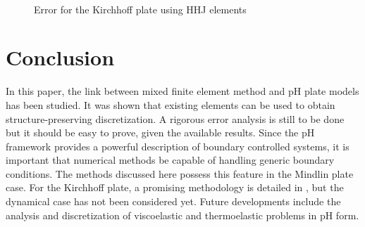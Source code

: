 \documentclass{ifacconf}
\begin{document}
\begin{figure}[ht]%
	\centering
	\hspace{8pt}%
	 \\
	\caption[errorHHF]{Error for the Kirchhoff plate using HHJ elements}%
	\label{fig:errorHHJ}%
\end{figure}

\section{Conclusion}
In this paper, the link between mixed finite element method and pH plate models has been studied. It was shown that existing elements can be used to obtain structure-preserving discretization. A rigorous error analysis is still to be done but it should be easy to prove, given the available results. Since the pH framework provides a powerful description of boundary controlled systems, it is important that numerical methods be capable of handling generic boundary conditions. The methods discussed here possess this feature in the Mindlin plate case. For the Kirchhoff plate, a promising methodology is detailed in \cite{mixed_kirchhoff}, but the dynamical case has not been considered yet. Future developments include the analysis and discretization of viscoelastic and thermoelastic problems in pH form.
\end{document}
